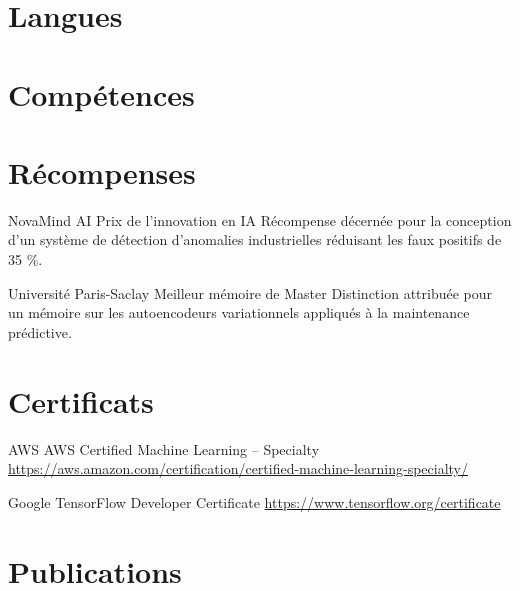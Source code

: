 \documentclass[a4paper, serif, 10pt]{moderncv}
\begin{document}
\section{Langues}

\section{Compétences}

\section{Récompenses}

        {NovaMind AI}
        {Prix de l'innovation en IA}
        {}
        {}
        {Récompense décernée pour la conception d'un système de détection d'anomalies industrielles réduisant les faux positifs de 35 \%.}

        {Université Paris-Saclay}
        {Meilleur mémoire de Master}
        {}
        {}
        {Distinction attribuée pour un mémoire sur les autoencodeurs variationnels appliqués à la maintenance prédictive.}
\section{Certificats}

        {AWS}
        {AWS Certified Machine Learning – Specialty}
        {\url{https://aws.amazon.com/certification/certified-machine-learning-specialty/}}
        {}
        {}

        {Google}
        {TensorFlow Developer Certificate}
        {\url{https://www.tensorflow.org/certificate}}
        {}
        {}
\section{Publications}
\end{document}
